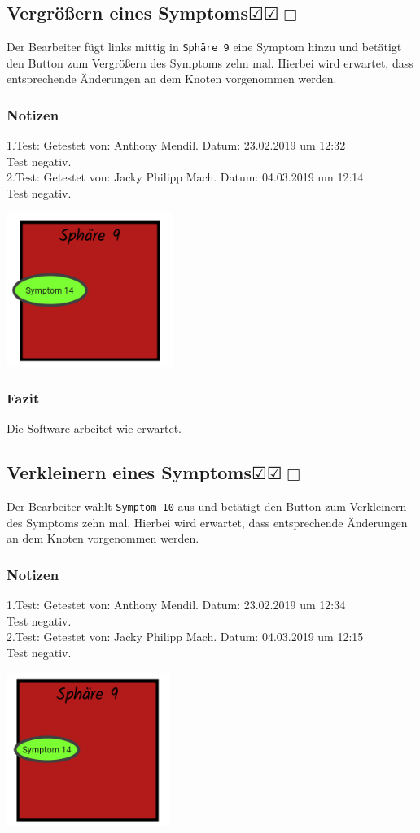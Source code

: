 \documentclass[enabledeprecatedfontcommands]{scrartcl}
\newcommand{\subsectiont}[2]{\subsection[#1]{#1{\normalsize\normalfont #2}}}
\newcommand{\leer}{$\Box$}
\newcommand{\ok}{$\CheckedBox$}
\begin{document}
\subsectiont{Vergrößern eines Symptoms}{\dotfill\ok\ok\leer}
Der Bearbeiter fügt links mittig in \texttt{Sphäre 9} eine Symptom hinzu und betätigt den Button zum Vergrößern des Symptoms zehn mal. Hierbei wird erwartet, dass entsprechende Änderungen an dem Knoten vorgenommen werden.
\subsubsection{Notizen}
1.Test: Getestet von: Anthony Mendil. Datum: 23.02.2019 um 12:32 \\
Test negativ.\\
2.Test: Getestet von: Jacky Philipp Mach. Datum: 04.03.2019 um 12:14 \\
Test negativ.
\begin{center}
\includegraphics[height=5cm]{2_23.PNG}
\end{center}
\subsubsection{Fazit}
Die Software arbeitet wie erwartet.

\subsectiont{Verkleinern eines Symptoms}{\dotfill\ok\ok\leer}
Der Bearbeiter wählt \texttt{Symptom 10} aus und betätigt den Button zum Verkleinern des Symptoms zehn mal. Hierbei wird erwartet, dass entsprechende Änderungen an dem Knoten vorgenommen werden.
\subsubsection{Notizen}
1.Test: Getestet von: Anthony Mendil. Datum: 23.02.2019 um 12:34 \\
Test negativ.\\
2.Test: Getestet von: Jacky Philipp Mach. Datum: 04.03.2019 um 12:15 \\
Test negativ.
\begin{center}
\includegraphics[height=5cm]{2_24.PNG}
\end{center}
\end{document}
